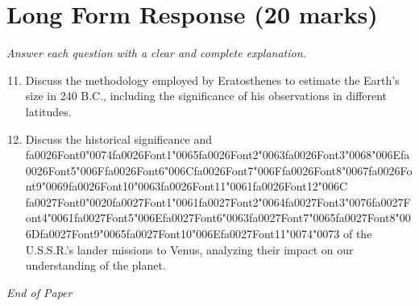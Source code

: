 \documentclass[12pt]{article}
\begin{document}
\section*{Long Form Response (20 marks)}
\textit{Answer each question with a clear and complete explanation.}
\begin{enumerate}[label=\arabic*.]
\setcounter{enumi}{10}
\item Discuss the methodology employed by Eratosthenes to estimate the Earth's size in 240 B.C.,
including the significance of his observations in different latitudes.
\item Discuss the historical significance and {\csname fa0026Font0\endcsname\char"0074}{\csname fa0026Font1\endcsname\char"0065}{\csname fa0026Font2\endcsname\char"0063}{\csname fa0026Font3\endcsname\char"0068}{\char"006E}{\csname fa0026Font5\endcsname\char"006F}{\csname fa0026Font6\endcsname\char"006C}{\csname fa0026Font7\endcsname\char"006F}{\csname fa0026Font8\endcsname\char"0067}{\csname fa0026Font9\endcsname\char"0069}{\csname fa0026Font10\endcsname\char"0063}{\csname fa0026Font11\endcsname\char"0061}{\csname fa0026Font12\endcsname\char"006C} {\csname fa0027Font0\endcsname\char"0020}{\csname fa0027Font1\endcsname\char"0061}{\csname fa0027Font2\endcsname\char"0064}{\csname fa0027Font3\endcsname\char"0076}{\csname fa0027Font4\endcsname\char"0061}{\csname fa0027Font5\endcsname\char"006E}{\csname fa0027Font6\endcsname\char"0063}{\csname fa0027Font7\endcsname\char"0065}{\csname fa0027Font8\endcsname\char"006D}{\csname fa0027Font9\endcsname\char"0065}{\csname fa0027Font10\endcsname\char"006E}{\csname fa0027Font11\endcsname\char"0074}{\char"0073} of the U.S.S.R.'s lander
missions to Venus, analyzing their impact on our understanding of the planet.
\end{enumerate}

\vfill
\noindent\textit{End of Paper}
\end{document}
